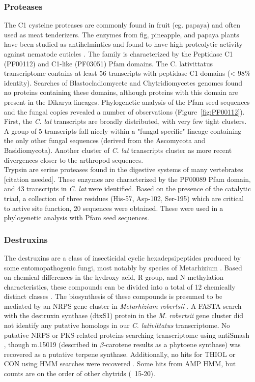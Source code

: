 \subsubsection*{Proteases} 
The C1 cysteine proteases are commonly found in fruit (eg. papaya) and often used as meat tenderizers. The enzymes from fig, pineapple, and papaya plants have been studied as antihelmintics and found to have high proteolytic activity against nematode cuticles \cite{Stepek2004}. The family is characterized by the Peptidase C1 (PF00112) and C1-like (PF03051) Pfam domains. The C. lativittatus transcriptome contains at least 56 transcripts with peptidase C1 domains (< 98\% identity). Searches of Blastocladiomycete and Chytridiomycetes genomes found no proteins containing these domains, although proteins with this domain are present in the Dikarya lineages. Phylogenetic analysis of the Pfam seed sequences and the fungal copies revealed a number of observations (Figure~\ref{fig:PF00112}). First, the \textit{C. lat} transcripts are broadly distributed, with very few tight clusters. A group of 5 transcripts fall nicely within a "fungal-specific" lineage containing the only other fungal sequences (derived from the Ascomycota and Basidiomycota). Another cluster of \textit{C. lat} transcripts cluster as more recent divergences closer to the arthropod sequences. \\
\indent Trypsin are serine proteases found in the digestive systems of many vertebrates [citation needed]. These enzymes are characterized by the PF00089 Pfam domain, and 43 transcripts in \textit{C. lat} were identified. Based on the presence of the catalytic triad, a collection of three residues (His-57, Asp-102, Ser-195) which are critical to active site function, 20 sequences were obtained. These were used in a phylogenetic analysis with Pfam seed sequences.\\
\subsubsection*{Destruxins}
The destruxins are a class of insecticidal cyclic hexadepsipeptides produced by some entomopathogenic fungi, most notably by species of Metarhizium \cite{Donzelli2012,Wang2012}. Based on chemical differences in the hydroxy acid, R group, and N-methylation characteristics, these compounds can be divided into a total of 12 chemically distinct classes \cite{Pedras2002,Wang2012}. The biosynthesis of these compounds is presumed to be mediated by an NRPS gene cluster in \textit{Metarhizium robertsii} \cite{Wang2012}. A FASTA search with the destruxin synthase (dtxS1) protein in the \textit{M. robertsii} gene cluster did not identify any putative homologs in our \textit{C. lativittatus} transcriptome. No putative NRPS or PKS-related proteins searching transcriptome using antiSmash \cite{Blin2013}, though m.15019 (described in $\beta$-carotene results as a phytoene synthase) was recovered as a putative terpene synthase. Additionally, no hits for THIOL or CON using HMM searches were recovered \cite{Bushley2010}. Some hits from AMP HMM, but counts are on the order of other chytrids (~15-20).\\

